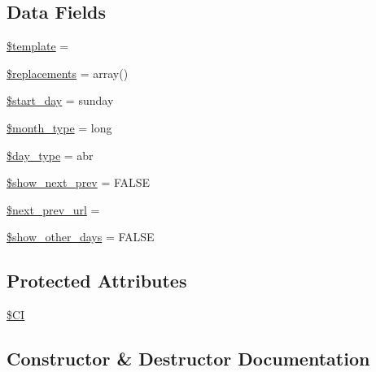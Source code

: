 \subsection*{Data Fields}
\begin{DoxyCompactItemize}
\item 
\mbox{\hyperlink{class_c_i___calendar_aa3e9534005fd516d941f6a5569896e01}{\$template}} = \textquotesingle{}\textquotesingle{}
\item 
\mbox{\hyperlink{class_c_i___calendar_a93cb3f67ace379a71de4fb00bcc7a605}{\$replacements}} = array()
\item 
\mbox{\hyperlink{class_c_i___calendar_ac4e461505bb7cd9a2fdb2bf47560a389}{\$start\+\_\+day}} = \textquotesingle{}sunday\textquotesingle{}
\item 
\mbox{\hyperlink{class_c_i___calendar_ab40961ce0a0e4a7ee10ad389c9566b28}{\$month\+\_\+type}} = \textquotesingle{}long\textquotesingle{}
\item 
\mbox{\hyperlink{class_c_i___calendar_a1e35fdb6b6cc297a6bb256517a8d813d}{\$day\+\_\+type}} = \textquotesingle{}abr\textquotesingle{}
\item 
\mbox{\hyperlink{class_c_i___calendar_aeade2ffe515604c0dffb78d32ca846ae}{\$show\+\_\+next\+\_\+prev}} = F\+A\+L\+SE
\item 
\mbox{\hyperlink{class_c_i___calendar_a3ed0df912e3e67eb17d432c1f54ae2de}{\$next\+\_\+prev\+\_\+url}} = \textquotesingle{}\textquotesingle{}
\item 
\mbox{\hyperlink{class_c_i___calendar_a52c552ab98b51789690522ff7d41ecb7}{\$show\+\_\+other\+\_\+days}} = F\+A\+L\+SE
\end{DoxyCompactItemize}
\subsection*{Protected Attributes}
\begin{DoxyCompactItemize}
\item 
\mbox{\hyperlink{class_c_i___calendar_ae0314d046ddf7fcfaec03222977427d3}{\$\+CI}}
\end{DoxyCompactItemize}


\subsection{Constructor \& Destructor Documentation}
\mbox{\label{class_c_i___calendar_af7f9493844d2d66e924e3c1df51ce616}} 
